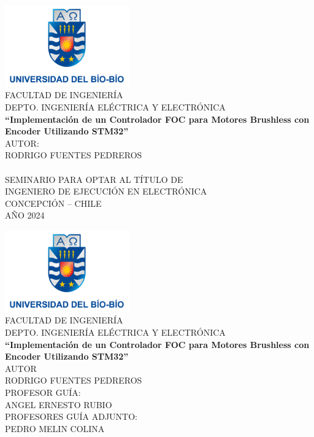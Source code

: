 \documentclass[11pt]{report}
\begin{document}
\begin{titlepage}
	\begin{center}
		\includegraphics[width=0.4\textwidth]{imagenes/logo_ubb.png}\\
		\normalsize FACULTAD DE INGENIERÍA\\
		DEPTO. INGENIERÍA ELÉCTRICA Y ELECTRÓNICA\\[2cm]

		\LARGE \textbf{``Implementación de un Controlador FOC para Motores Brushless con Encoder Utilizando STM32''}\\[6cm]

		\normalsize AUTOR:\\
		RODRIGO FUENTES PEDREROS\\
		\href{https://www.youtube.com/watch?v=dQw4w9WgXcQ}{\phantom{ASDF}}\\[2cm]

		SEMINARIO PARA OPTAR AL TÍTULO DE\\
		INGENIERO DE EJECUCIÓN EN ELECTRÓNICA\\[1cm]

		CONCEPCIÓN – CHILE\\
		AÑO 2024\\
	\end{center}
\end{titlepage}

\begin{titlepage}
	\begin{center}
		\includegraphics[width=0.4\textwidth]{imagenes/logo_ubb.png}\\
		\normalsize FACULTAD DE INGENIERÍA\\
		DEPTO. INGENIERÍA ELÉCTRICA Y ELECTRÓNICA\\[2cm]

		\LARGE \textbf{``Implementación de un Controlador FOC para Motores Brushless con Encoder Utilizando STM32''}\\[5cm]

		\normalsize AUTOR\\
		RODRIGO FUENTES PEDREROS\\[3cm]

		\large PROFESOR GUÍA:\\
		\large ANGEL ERNESTO RUBIO\\[1cm]
		\large PROFESORES GUÍA ADJUNTO:\\
		\large PEDRO MELIN COLINA
	\end{center}
\end{titlepage}
\end{document}
